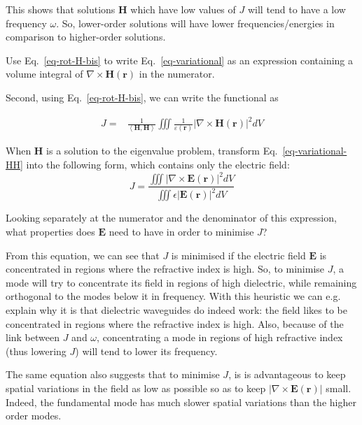 This shows that solutions ${\mathbf H}$ which have low values of $J$ will tend to have a low frequency $\omega$. So, lower-order solutions will have lower frequencies/energies in comparison to higher-order solutions.

\begin{cue}
Use Eq.~\ref{eq-rot-H-bis} to write Eq.~\ref {eq-variational} as an expression containing a volume integral of $ \nabla \times {\mathbf H({\mathbf r})}$ in the numerator.   
\end{cue}

Second, using Eq.~\ref{eq-rot-H-bis}, we can write the functional as

\begin{align}
J =& \frac{1}{\left\langle {\mathbf H} , {\mathbf H}\right\rangle}  \iiint \frac{1}{\varepsilon({\mathbf r})} \left | \nabla \times {\mathbf H({\mathbf r})} \right |^2  dV  \label{eq-variational-HH}
\end{align} 

\pagebreak

\begin{exer}
When ${\mathbf H}$ is a solution to the eigenvalue problem, transform Eq.~\ref{eq-variational-HH} into the following form, which contains only the electric field:
$$J=\frac{\iiint \left | \nabla \times {\mathbf E({\mathbf r})} \right |^2  dV} {\iiint \epsilon \left | {\mathbf E({\mathbf r})} \right |^2  dV} $$
\end{exer}

\begin{cue}
Looking separately at the numerator and the denominator of this expression, what properties does ${\mathbf E}$ need to have in order to minimise $J$?   
\end{cue}

From this equation, we can see that $J$ is minimised if the electric field ${\mathbf E}$ is concentrated in regions where the refractive index is high. So, to minimise $J$, a mode will try to concentrate its field in regions of high dielectric, while remaining orthogonal to the modes below it in frequency. With this heuristic we can e.g. explain why it is that dielectric waveguides do indeed work: the field likes to be concentrated in regions where the refractive index is high. Also, because of the link between $J$ and $\omega$, concentrating a mode in regions of high refractive index (thus lowering $J$) will tend to lower its frequency.

The same equation also suggests that to minimise $J$, is is advantageous to keep spatial variations in the field as low as possible so as to keep  $\left| \nabla \times {\mathbf E({\mathbf r})} \right |$ small. Indeed, the fundamental mode has much slower spatial variations than the higher order modes.

